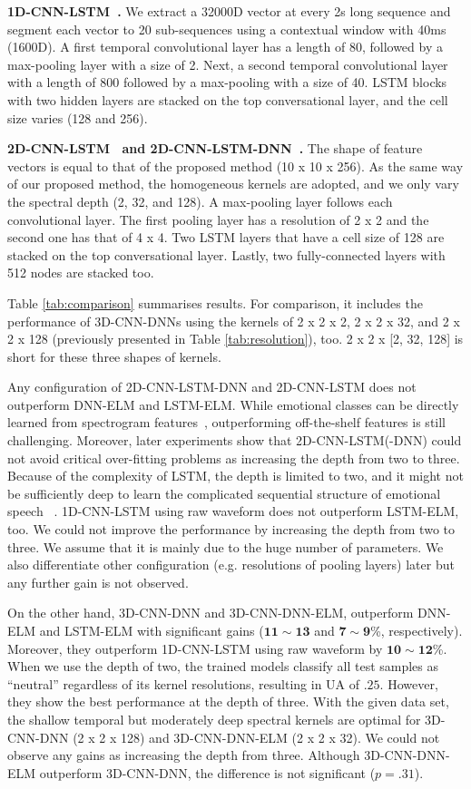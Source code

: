 \documentclass[conference, compsoc, twoside]{IEEEtran}
\begin{document}
\textbf{1D-CNN-LSTM~\cite{trigeorgis2016adieu}.} We extract a 32000D vector at every 2s long sequence and segment each vector to 20 sub-sequences using a contextual window with 40ms (1600D). A first temporal convolutional layer has a length of 80, followed by a max-pooling layer with a size of 2. Next, a second temporal convolutional layer with a length of 800 followed by a max-pooling with a size of 40. LSTM blocks with two hidden layers are stacked on the top conversational layer, and the cell size varies (128 and 256).

\textbf{2D-CNN-LSTM~\cite{anandconvoluted} and 2D-CNN-LSTM-DNN~\cite{sainath2015convolutional}.} The shape of feature vectors is equal to that of the proposed method (10 x 10 x 256). As the same way of our proposed method, the homogeneous kernels are adopted, and we only vary the spectral depth (2, 32, and 128). A max-pooling layer follows each convolutional layer. The first pooling layer has a resolution of 2 x 2 and the second one has that of 4 x 4. Two LSTM layers that have a cell size of 128 are stacked on the top conversational layer. Lastly, two fully-connected layers with 512 nodes are stacked too.


Table \ref{tab:comparison} summarises results. For comparison, it includes the performance of 3D-CNN-DNNs using the kernels of 2 x 2 x 2, 2 x 2 x 32, and 2 x 2 x 128 (previously presented in Table \ref{tab:resolution}), too.  2 x 2 x [2, 32, 128] is short for these three shapes of kernels. 

Any configuration of 2D-CNN-LSTM-DNN and 2D-CNN-LSTM does not outperform DNN-ELM and LSTM-ELM. While emotional classes can be directly learned from spectrogram features~\cite{ghoshrepresentation2016}, outperforming off-the-shelf features is still challenging. Moreover, later experiments show that 2D-CNN-LSTM(-DNN) could not avoid critical over-fitting problems as increasing the depth from two to three. Because of the complexity of LSTM, the depth is limited to two, and it might not be sufficiently deep to learn the complicated sequential structure of emotional speech ~\cite{kim2013emotion}. 1D-CNN-LSTM using raw waveform does not outperform LSTM-ELM, too. We could not improve the performance by increasing the depth from two to three. We assume that it is mainly due to the huge number of parameters. We also differentiate other configuration (e.g. resolutions of pooling layers) later but any further gain is not observed. 

On the other hand, 3D-CNN-DNN and 3D-CNN-DNN-ELM, outperform DNN-ELM and LSTM-ELM with significant gains ($\mathbf{11 \sim 13}$ and $\mathbf{7 \sim 9}$\%, respectively). Moreover, they outperform 1D-CNN-LSTM using raw waveform by $\mathbf{10 \sim 12}$\%. When we use the depth of two, the trained models classify all test samples as ``neutral'' regardless of its kernel resolutions, resulting in UA of $.25$. However, they show the best performance at the depth of three. With the given data set, the shallow temporal but moderately deep spectral kernels are optimal for 3D-CNN-DNN (2 x 2 x 128) and 3D-CNN-DNN-ELM (2 x 2 x 32). We could not observe any gains as increasing the depth from three. Although 3D-CNN-DNN-ELM outperform 3D-CNN-DNN, the difference is not significant ($p = .31$). 
\end{document}
